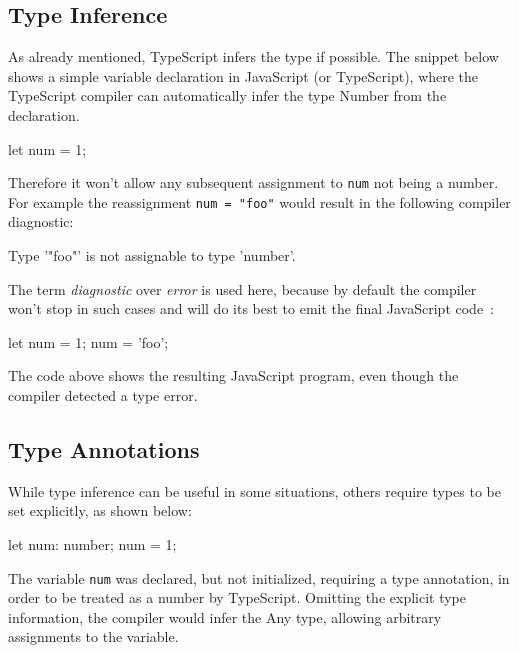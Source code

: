 \subsection{Type Inference}
\label{sec:ts-type-inference}

As already mentioned, TypeScript infers the type if possible. The snippet below shows a simple variable declaration in JavaScript (or TypeScript), where the TypeScript compiler can automatically infer the type Number from the declaration.
\begin{JsCode}[numbers=none]
let num = 1;
\end{JsCode}
Therefore it won't allow any subsequent assignment to \texttt{num} not being a number. For example the reassignment \texttt{num = "foo"} would result in the following compiler diagnostic:
\begin{JsCode}[numbers=none]
Type '"foo"' is not assignable to type 'number'.
\end{JsCode}
The term \emph{diagnostic} over \emph{error} is used here, because by default the compiler won't stop in such cases and will do its best to emit the final JavaScript code~\cite[p.~12]{TypeScriptBook:Syed:2017}:
\begin{JsCode}[numbers=none]
let num = 1;
num = 'foo';
\end{JsCode}
The code above shows the resulting JavaScript program, even though the compiler detected a type error.

\subsection{Type Annotations}
\label{sec:ts-type-annotations}

While type inference can be useful in some situations, others require types to be set explicitly, as shown below:
\begin{JsCode}[numbers=none]
let num: number;
num = 1;
\end{JsCode}
The variable \texttt{num} was declared, but not initialized, requiring  a type annotation, in order to be treated as a number by TypeScript. Omitting the explicit type information, the compiler would infer the Any type, allowing arbitrary assignments to the variable.

%
%

